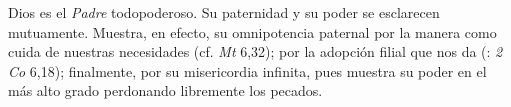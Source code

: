 
 Dios es el \emph{Padre} todopoderoso. Su paternidad y su poder se esclarecen mutuamente. Muestra, en efecto, su omnipotencia paternal por la manera como cuida de nuestras necesidades (cf. \emph{Mt} 6,32); por la adopción filial que nos da (: \emph{2 Co} 6,18); finalmente, por su misericordia infinita, pues muestra su poder en el más alto grado perdonando libremente los pecados.